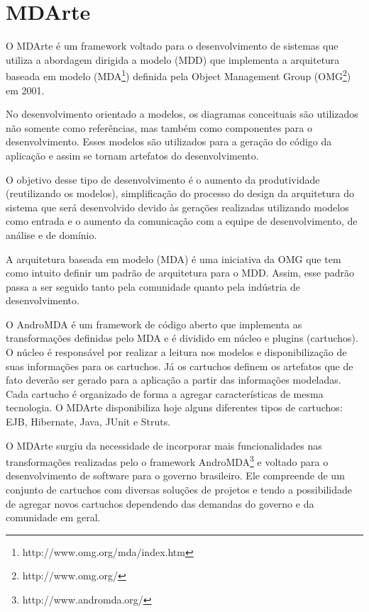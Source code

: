 \chapter{MDArte}
O MDArte é um framework voltado para o desenvolvimento de sistemas que utiliza a
abordagem dirigida a modelo (MDD) que implementa a arquitetura baseada em modelo
(MDA\footnote{http://www.omg.org/mda/index.htm}) definida pela Object Management
Group (OMG\footnote{http://www.omg.org/}) em 2001.

No desenvolvimento orientado a modelos, os diagramas conceituais são utilizados
não somente como referências, mas também como componentes para o
desenvolvimento. Esses modelos são utilizados para a geração do código da
aplicação e assim se tornam artefatos do desenvolvimento.

O objetivo desse tipo de desenvolvimento é o aumento da produtividade
(reutilizando os modelos), simplificação do processo do design da arquitetura do
sistema que será desenvolvido devido às gerações realizadas utilizando modelos
como entrada e o aumento da comunicação com a equipe de desenvolvimento, de
análise e de domínio.

A arquitetura baseada em modelo (MDA) é uma iniciativa da OMG que tem como
intuito definir um padrão de arquitetura para o MDD. Assim, esse padrão passa a
ser seguido tanto pela comunidade quanto pela indústria de desenvolvimento.

O AndroMDA é um framework de código aberto que implementa as transformações
definidas pelo MDA e é dividido em núcleo e plugins (cartuchos). O núcleo é
responsável por realizar a leitura nos modelos e disponibilização de suas
informações para os cartuchos. Já os cartuchos definem os artefatos que de fato
deverão ser gerado para a aplicação a partir das informações modeladas. Cada
cartucho é organizado de forma a agregar características de mesma tecnologia.
O MDArte disponibiliza hoje alguns diferentes tipos de cartuchos: EJB,
Hibernate, Java, JUnit e Struts.

O MDArte surgiu da necessidade de incorporar mais funcionalidades nas
transformações realizadas pelo o framework
AndroMDA\footnote{http://www.andromda.org/} e voltado para o desenvolvimento de
software para o governo brasileiro. Ele compreende de um conjunto de cartuchos
com diversas soluções de projetos e tendo a possibilidade de agregar novos
cartuchos dependendo das demandas do governo e da comunidade em geral. 
